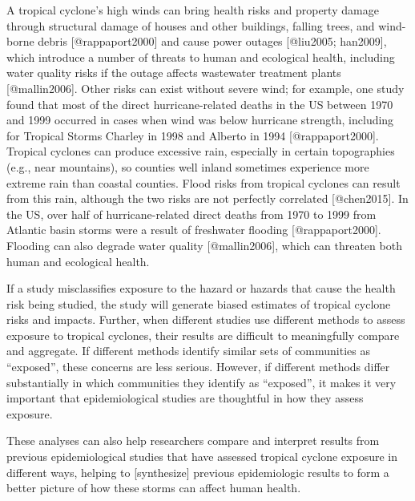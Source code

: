 A tropical cyclone's high winds can bring health risks and property damage
through structural damage of houses and other buildings, falling trees, and
wind-borne debris [@rappaport2000] and cause power
outages [@liu2005; han2009], which introduce a number of threats to
human and ecological health, including water quality risks if the outage affects
wastewater treatment plants [@mallin2006].  Other risks can exist
without severe wind; for example, one study found that most of the direct
hurricane-related deaths in the US between 1970 and 1999 occurred in cases
when wind was below hurricane strength, including for Tropical Storms Charley
in 1998 and Alberto in 1994 [@rappaport2000].  Tropical cyclones can
produce excessive rain, especially in certain topographies (e.g., near
mountains), so counties well inland sometimes experience more extreme rain than
coastal counties. Flood risks from tropical cyclones can result from this rain,
although the two risks are not perfectly correlated [@chen2015]. In the
US, over half of hurricane-related direct deaths from 1970 to 1999 from
Atlantic basin storms were a result of freshwater
flooding [@rappaport2000]. Flooding can also degrade water
quality [@mallin2006], which can threaten both human and ecological
health.

If a study misclassifies exposure to the hazard or hazards that cause the
health risk being studied, the study will generate biased estimates of tropical
cyclone risks and impacts. Further, when different studies use different
methods to assess exposure to tropical cyclones, their results are difficult to
meaningfully compare and aggregate. If different methods identify
similar sets of communities as ``exposed'',  these concerns are less serious.
However, if different methods differ substantially in which communities they
identify as ``exposed'', it makes it very important that epidemiological
studies are thoughtful in how they assess exposure.

These analyses can also help researchers compare and interpret results from
previous epidemiological studies that have assessed tropical cyclone exposure in
different ways, helping to [synthesize] previous epidemiologic results to form a
better picture of how these storms can affect human health.

